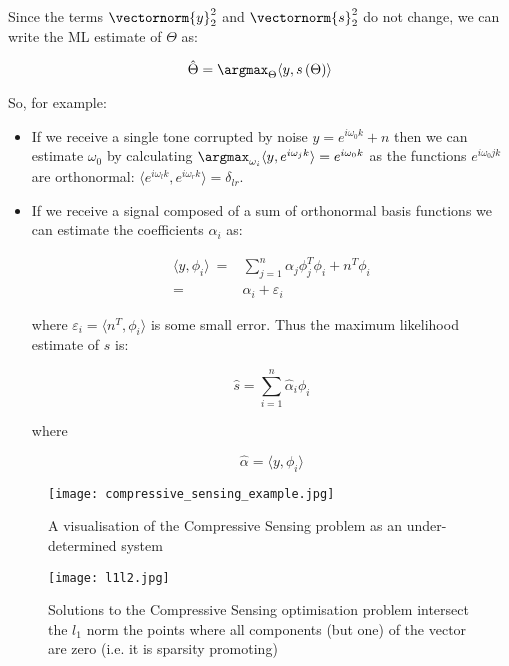Since the terms \(\vectornorm{y}_2^2\) and \(\vectornorm{s}_2^2\) do not change, we can write the ML estimate of \(\Theta\) as:

\begin{equation}
\hat{\Theta} = \argmax_{\Theta} \langle y, s\left(\Theta\right)\rangle
\end{equation}

So, for example:

\begin{itemize}
\item If we receive a single tone corrupted by noise \(y = e^{i \omega_0 k} + n\) then we can estimate \(\omega_0\) by calculating \(\argmax_{\omega_i} \langle y, e^{i \omega_j k}\rangle = e^{i \omega_0 k}\) as the functions \(e^{i \omega_0 j k }\) are orthonormal: \(\langle e^{i \omega_l k}, e^{i \omega_r k} \rangle = \delta_{lr}\).

\item If we receive a signal composed of a sum of orthonormal basis functions we can estimate the coefficients \(\alpha_i\) as:

\begin{align}
\langle y, \phi_i\rangle\ =& \sum_{j=1}^n \alpha_j \phi_j^T\phi_i + n^T\phi_i \\
=& \alpha_i + \varepsilon_i
\end{align}

where \(\varepsilon_i = \langle n^T, \phi_i \rangle \) is some small error. Thus the maximum likelihood estimate of \(s\) is:

\begin{equation}
\hat{s} = \sum_{i=1}^n \hat{\alpha}_i \phi_i
\end{equation}

where

\begin{equation}
\hat{\alpha} = \langle y, \phi_i \rangle
\end{equation}

\end{itemize}

\begin{figure*}[h]
\centering
\texttt{[image: compressive\_sensing\_example.jpg]}
\caption{A visualisation of the Compressive Sensing problem as an under-determined system}
\label{l1l2}
\end{figure*}


\begin{figure*}[h]
\centering
\texttt{[image: l1l2.jpg]}
\caption{Solutions to the Compressive Sensing optimisation problem intersect the \(l_1\) norm the points where all components (but one) of the vector are zero (i.e. it is sparsity promoting) \cite{Tibshirani1996}}
\label{l1l2}
\end{figure*}
